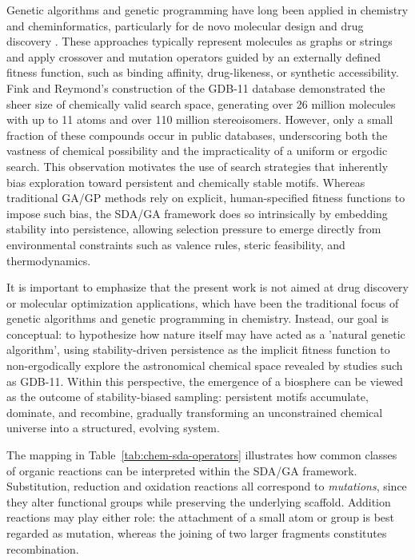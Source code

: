 \documentclass[life,article,submit,pdftex,moreauthors]{Definitions/mdpi}
\begin{document}
Genetic algorithms and genetic programming have long been applied in chemistry and 
cheminformatics, particularly for de novo molecular design and drug discovery 
\cite{brown2004ga,lewis1998gp,jensen2019ga,yoshikawa2018ga}. These approaches typically 
represent molecules as graphs or strings and apply crossover and mutation operators 
guided by an externally defined fitness function, such as binding affinity, 
drug-likeness, or synthetic accessibility. Fink and Reymond’s construction of the
GDB-11 database \cite{fink2007gdb11} demonstrated the sheer size of chemically valid
search space, generating over 26 million molecules with up to 11 atoms and over
110 million stereoisomers. However, only a small fraction of these compounds occur in
public databases, underscoring both the vastness of chemical possibility and the impracticality of a uniform or ergodic search. This observation motivates the use of
search strategies that inherently bias exploration toward persistent and chemically
stable motifs. Whereas traditional GA/GP methods rely on explicit, human-specified 
fitness functions to impose such bias, the SDA/GA framework does so intrinsically by
embedding stability into persistence, allowing selection pressure to emerge directly
from environmental constraints such as valence rules, steric feasibility, and
thermodynamics.

It is important to emphasize that the present work is not aimed at drug discovery
or molecular optimization applications, which have been the traditional focus of
genetic algorithms and genetic programming in chemistry. Instead, our goal is
conceptual: to hypothesize how nature itself may have acted as a 'natural genetic algorithm', using stability-driven persistence as the implicit fitness function to
non-ergodically explore the astronomical chemical space revealed by studies such
as GDB-11. Within this perspective, the emergence of a biosphere can be viewed as
the outcome of stability-biased sampling: persistent motifs accumulate, dominate, 
and recombine, gradually transforming an unconstrained chemical universe into a
structured, evolving system.


The mapping in Table~\ref{tab:chem-sda-operators} illustrates how common classes of organic reactions can be interpreted within the SDA/GA framework. Substitution, reduction and oxidation reactions all correspond to \textit{mutations}, since they alter functional groups while preserving the underlying scaffold. Addition reactions may play either role: the attachment of a small atom or group is best regarded as mutation, whereas the joining of two larger fragments constitutes recombination.  
\end{document}

